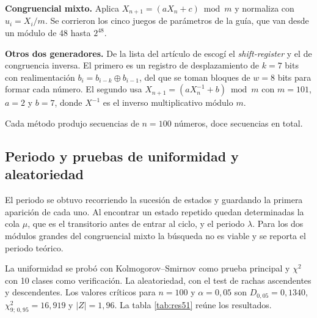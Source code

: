 \documentclass[11pt,letterpaper]{article}
\begin{document}
\textbf{Congruencial mixto.} Aplica $X_{n+1} = (a X_n + c) \bmod m$ y normaliza con $u_i = X_i/m$. Se
corrieron los cinco juegos de parámetros de la guía, que van desde un módulo de 48 hasta $2^{48}$.

\textbf{Otros dos generadores.} De la lista del artículo de \cite{mancilla2000} escogí el
\emph{shift-register} y el de congruencia inversa. El primero es un registro de desplazamiento de
$k = 7$ bits con realimentación $b_i = b_{i-k} \oplus b_{i-1}$, del que se toman bloques de $w = 8$
bits para formar cada número. El segundo usa $X_{n+1} = (a X_n^{-1} + b) \bmod m$ con $m = 101$,
$a = 2$ y $b = 7$, donde $X^{-1}$ es el inverso multiplicativo módulo $m$.

Cada método produjo secuencias de $n = 100$ números, doce secuencias en total.

\subsection{Periodo y pruebas de uniformidad y aleatoriedad}

El periodo se obtuvo recorriendo la sucesión de estados y guardando la primera aparición de cada uno.
Al encontrar un estado repetido quedan determinadas la cola $\mu$, que es el transitorio antes de
entrar al ciclo, y el periodo $\lambda$. Para los dos módulos grandes del congruencial mixto la
búsqueda no es viable y se reporta el periodo teórico.

La uniformidad se probó con Kolmogorov--Smirnov como prueba principal y $\chi^2$ con 10 clases como
verificación. La aleatoriedad, con el test de rachas ascendentes y descendentes. Los valores críticos
para $n = 100$ y $\alpha = 0{,}05$ son $D_{0,05} = 0{,}1340$, $\chi^2_{9;\,0,95} = 16{,}919$ y
$|Z| = 1{,}96$. La tabla \ref{tab:res51} reúne los resultados.
\end{document}
